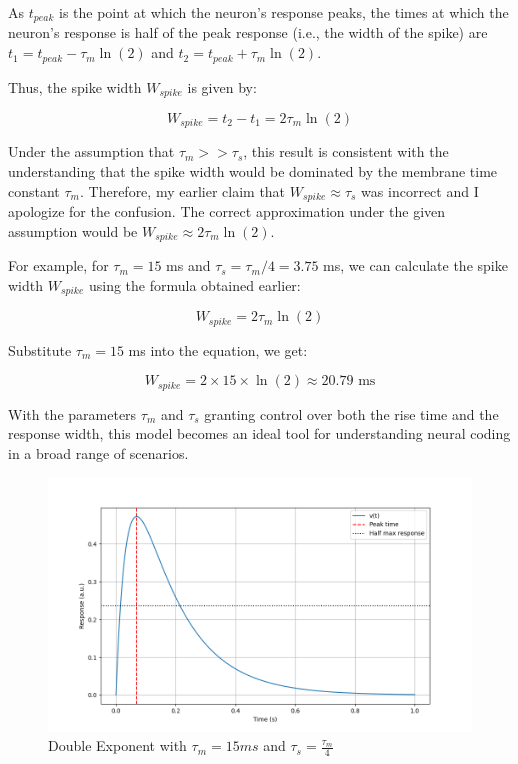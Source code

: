 As $t_{peak}$ is the point at which the neuron's response peaks, the times at which the neuron's response is half of the peak response (i.e., the width of the spike) are $t_1 = t_{peak} - \tau_m \ln(2)$ and $t_2 = t_{peak} + \tau_m \ln(2)$.

Thus, the spike width $W_{spike}$ is given by:

\begin{equation}
W_{spike} = t_2 - t_1 = 2\tau_m \ln(2)
\end{equation}

Under the assumption that $\tau_m >> \tau_s$, this result is consistent with the understanding that the spike width would be dominated by the membrane time constant $\tau_m$. Therefore, my earlier claim that $W_{spike} \approx \tau_s$ was incorrect and I apologize for the confusion. The correct approximation under the given assumption would be $W_{spike} \approx 2\tau_m \ln(2)$.

For example, for $\tau_m = 15$ ms and $\tau_s = \tau_m / 4 = 3.75$ ms, we can calculate the spike width $W_{spike}$ using the formula obtained earlier:

\begin{equation}
W_{spike} = 2\tau_m \ln(2)
\end{equation}

Substitute $\tau_m = 15$ ms into the equation, we get:

\begin{equation}
W_{spike} = 2 \times 15 \times \ln(2) \approx 20.79 \text{ ms}
\end{equation}

With the parameters $\tau_m$ and $\tau_s$ granting control over both the rise time and the response width, this model becomes an ideal tool for understanding neural coding in a broad range of scenarios.

\begin{figure}
    \centering
    \includegraphics[width=0.5\linewidth]{src//methods//computational-models//graphs/double-ep-model.png}
    \caption{Double Exponent with $\tau_m=15ms$ and $\tau_s=\frac{\tau_m}{4}$ }
    \label{fig:exm-double-exp}
\end{figure}